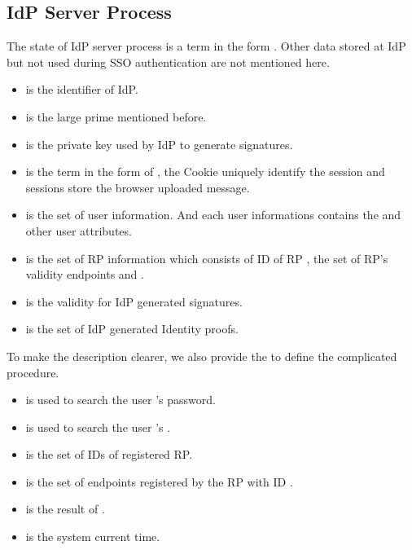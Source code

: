\begin{appendices}
\subsection{IdP Server Process}
The state of IdP server process is a term in the form . Other data stored at IdP but not used during SSO authentication are not mentioned here.
\begin{itemize}
\item {} is the identifier of IdP.
\item {} is the large prime mentioned before.
\item {} is the private key used by IdP to generate signatures.
\item {} is the term in the form of , the Cookie uniquely identify the session and sessions store the  browser uploaded message.
\item {} is the set of user information. And each user informations contains the   and other user attributes.
\item {} is the set of RP information which consists of ID of RP ,  the set of RP's validity endpoints and . 
\item {} is the validity for IdP generated signatures. 
\item {} is the set of IdP generated Identity proofs.
\end{itemize}
To make the description clearer, we also provide the  to define the complicated procedure. 
\begin{itemize}
\item {} is used to search the user 's password.
\item {} is used to search the user 's .
\item {} is the set of IDs of registered RP.
\item {} is the set of endpoints registered by the RP with ID . 
\item {} is the result of .
\item {} is the system current time.
\end{itemize}


\end{appendices}
